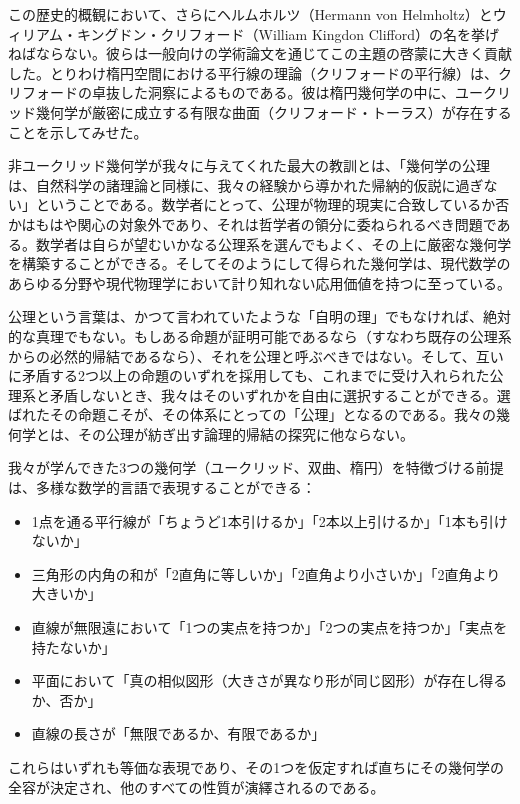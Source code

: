 この歴史的概観において、さらにヘルムホルツ（Hermann von Helmholtz）とウィリアム・キングドン・クリフォード（William Kingdon Clifford）の名を挙げねばならない。彼らは一般向けの学術論文を通じてこの主題の啓蒙に大きく貢献した。とりわけ楕円空間における平行線の理論（クリフォードの平行線）は、クリフォードの卓抜した洞察によるものである。彼は楕円幾何学の中に、ユークリッド幾何学が厳密に成立する有限な曲面（クリフォード・トーラス）が存在することを示してみせた。

非ユークリッド幾何学が我々に与えてくれた最大の教訓とは、「幾何学の公理は、自然科学の諸理論と同様に、我々の経験から導かれた帰納的仮説に過ぎない」ということである。数学者にとって、公理が物理的現実に合致しているか否かはもはや関心の対象外であり、それは哲学者の領分に委ねられるべき問題である。数学者は自らが望むいかなる公理系を選んでもよく、その上に厳密な幾何学を構築することができる。そしてそのようにして得られた幾何学は、現代数学のあらゆる分野や現代物理学において計り知れない応用価値を持つに至っている。

公理という言葉は、かつて言われていたような「自明の理」でもなければ、絶対的な真理でもない。もしある命題が証明可能であるなら（すなわち既存の公理系からの必然的帰結であるなら）、それを公理と呼ぶべきではない。そして、互いに矛盾する2つ以上の命題のいずれを採用しても、これまでに受け入れられた公理系と矛盾しないとき、我々はそのいずれかを自由に選択することができる。選ばれたその命題こそが、その体系にとっての「公理」となるのである。我々の幾何学とは、その公理が紡ぎ出す論理的帰結の探究に他ならない。

我々が学んできた3つの幾何学（ユークリッド、双曲、楕円）を特徴づける前提は、多様な数学的言語で表現することができる：
\begin{itemize}
\item 1点を通る平行線が「ちょうど1本引けるか」「2本以上引けるか」「1本も引けないか」
\item 三角形の内角の和が「2直角に等しいか」「2直角より小さいか」「2直角より大きいか」
\item 直線が無限遠において「1つの実点を持つか」「2つの実点を持つか」「実点を持たないか」
\item 平面において「真の相似図形（大きさが異なり形が同じ図形）が存在し得るか、否か」
\item 直線の長さが「無限であるか、有限であるか」
\end{itemize}
これらはいずれも等価な表現であり、その1つを仮定すれば直ちにその幾何学の全容が決定され、他のすべての性質が演繹されるのである。
